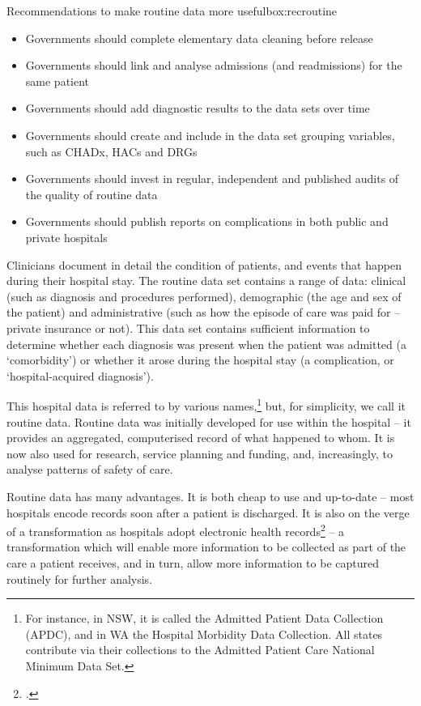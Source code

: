 \documentclass[FrontPage]{grattan}
\begin{document}
\begin{addsmallbox}{Recommendations to make routine data more useful}{box:recroutine}
\begin{itemize}[leftmargin=*]
    \item Governments should complete elementary data cleaning before release
    \item Governments should link and analyse admissions (and readmissions) for the same patient
    \item Governments should add diagnostic results to the data sets over time
    \item Governments should create and include in the data set grouping variables, such as CHADx, HACs and DRGs
    \item Governments should invest in regular, independent and published audits of the quality of routine data
    \item Governments should publish reports on complications in both public and private hospitals
\end{itemize}
\end{addsmallbox}

Clinicians document in detail the condition of patients, and events that happen during their hospital stay. The routine data set contains a range of data: clinical (such as diagnosis and procedures performed), demographic (the age and sex of the patient) and administrative (such as how the episode of care was paid for -- private insurance or not). This data set contains sufficient information to determine whether each diagnosis was present when the patient was admitted (a ‘comorbidity’) or whether it arose during the hospital stay (a complication, or ‘hospital-acquired diagnosis’).

This hospital data is referred to by various names,\footnote{For instance, in NSW, it is called the Admitted Patient Data Collection (APDC), and in WA the Hospital Morbidity Data Collection. All states contribute via their collections to the Admitted Patient Care National Minimum Data Set.} but, for simplicity, we call it routine data. Routine data was initially developed for use within the hospital -- it provides an aggregated, computerised record of what happened to whom. It is now also used for research, service planning and funding, and, increasingly, to analyse patterns of safety of care.

Routine data has many advantages. It is both cheap to use and up-to-date – most hospitals encode records soon after a patient is discharged. It is also on the verge of a transformation as hospitals adopt electronic health records\footcites{RN21}{RN20}{RN19} -- a transformation which will enable more information to be collected as part of the care a patient receives, and in turn, allow more information to be captured routinely for further analysis.
\end{document}
